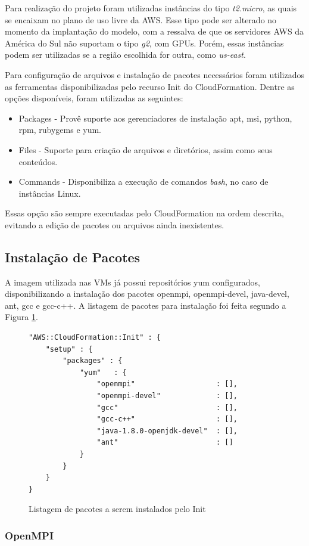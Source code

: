 \documentclass[tg]{mdtufsm}
\begin{document}
Para realização do projeto foram utilizadas instâncias do tipo \emph{t2.micro}, as quais se encaixam no plano de uso livre da AWS. Esse tipo pode ser alterado no momento da implantação do modelo, com a ressalva de que os servidores AWS da América do Sul não suportam o tipo \emph{g2}, com GPUs. Porém, essas instâncias podem ser utilizadas se a região escolhida for outra, como \emph{us-east}.

Para configuração de arquivos e instalação de pacotes necessários foram utilizados as ferramentas disponibilizadas pelo recurso Init do CloudFormation. Dentre as opções disponíveis, foram utilizadas as seguintes:

\begin{itemize}
\item Packages - Provê suporte aos gerenciadores de instalação apt, msi, python, rpm, rubygems e yum. 
\item Files - Suporte para criação de arquivos e diretórios, assim como seus conteúdos.
\item Commands - Disponibiliza a execução de comandos \emph{bash}, no caso de instâncias Linux.
\end{itemize}

Essas opção são sempre executadas pelo CloudFormation na ordem descrita, evitando a edição de pacotes ou arquivos ainda inexistentes.

\subsection{Instalação de Pacotes}

A imagem utilizada nas VMs já possui repositórios yum configurados, disponibilizando a instalação dos pacotes openmpi, openmpi-devel, java-devel, ant, gcc e gcc-c++. A listagem de pacotes para instalação foi feita segundo a Figura \ref{pacotes}.

\begin{figure}
\centering
\begin{lstlisting}[frame=single, numbers=none]
"AWS::CloudFormation::Init" : {
	"setup" : {
		"packages" : {
			"yum"	: {
				"openmpi"					: [],
				"openmpi-devel"				: [],
				"gcc"						: [],
				"gcc-c++"					: [],
				"java-1.8.0-openjdk-devel"	: [],
				"ant"						: []
			}
		}
	}
}
\end{lstlisting}
\caption{Listagem de pacotes a serem instalados pelo Init}
\label{pacotes}
\end{figure}

\subsubsection{OpenMPI}
\end{document}

